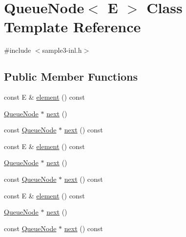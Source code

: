 \hypertarget{class_queue_node}{}\section{Queue\+Node$<$ E $>$ Class Template Reference}
\label{class_queue_node}


{\ttfamily \#include $<$sample3-\/inl.\+h$>$}

\subsection*{Public Member Functions}
\begin{DoxyCompactItemize}
\item 
const E \& \mbox{\hyperlink{class_queue_node_a1c61b3ed32e089f5901b87022ef84985}{element}} () const
\item 
\mbox{\hyperlink{class_queue_node}{Queue\+Node}} $\ast$ \mbox{\hyperlink{class_queue_node_a8a9fdf488da06533360999ef85db56ea}{next}} ()
\item 
const \mbox{\hyperlink{class_queue_node}{Queue\+Node}} $\ast$ \mbox{\hyperlink{class_queue_node_ada477e4f309f29383112dbda473dd985}{next}} () const
\item 
const E \& \mbox{\hyperlink{class_queue_node_a1c61b3ed32e089f5901b87022ef84985}{element}} () const
\item 
\mbox{\hyperlink{class_queue_node}{Queue\+Node}} $\ast$ \mbox{\hyperlink{class_queue_node_a8a9fdf488da06533360999ef85db56ea}{next}} ()
\item 
const \mbox{\hyperlink{class_queue_node}{Queue\+Node}} $\ast$ \mbox{\hyperlink{class_queue_node_ada477e4f309f29383112dbda473dd985}{next}} () const
\item 
const E \& \mbox{\hyperlink{class_queue_node_a1c61b3ed32e089f5901b87022ef84985}{element}} () const
\item 
\mbox{\hyperlink{class_queue_node}{Queue\+Node}} $\ast$ \mbox{\hyperlink{class_queue_node_a8a9fdf488da06533360999ef85db56ea}{next}} ()
\item 
const \mbox{\hyperlink{class_queue_node}{Queue\+Node}} $\ast$ \mbox{\hyperlink{class_queue_node_ada477e4f309f29383112dbda473dd985}{next}} () const
\end{DoxyCompactItemize}
